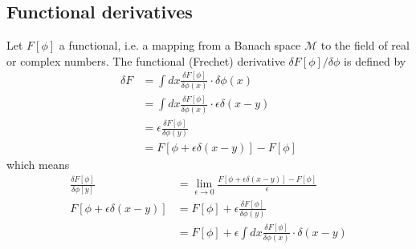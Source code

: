 \documentclass[10pt,a4paper]{book}
\theoremstyle{definition}
\begin{document}
\subsection{Functional derivatives}
Let $F[\phi]$ a functional, i.e. a mapping from a Banach space $\mathcal{M}$ to the field of real or complex numbers. The functional (Frechet) derivative $\delta F[\phi]/\delta\phi$ is defined by
\begin{align}
    \delta F
    &=\int dx \frac{\delta F[\phi]}{\delta\phi(x)}\cdot\delta\phi(x)\\
    &=\int dx \frac{\delta F[\phi]}{\delta\phi(x)}\cdot\epsilon\delta(x-y)\\
    &=\epsilon\frac{\delta F[\phi]}{\delta\phi(y)}\\
    &=F[\phi+\epsilon\delta(x-y)]-F[\phi]
\end{align}
which means
\begin{align}
    \frac{\delta F[\phi]}{\delta\phi[y]}&=\lim_{\epsilon\rightarrow0}\frac{F[\phi+\epsilon\delta(x-y)]-F[\phi]}{\epsilon}\\
    F[\phi+\epsilon\delta(x-y)]&=F[\phi]+\epsilon\frac{\delta F[\phi]}{\delta\phi(y)}\\
    &=F[\phi]+\epsilon\int dx \frac{\delta F[\phi]}{\delta\phi(x)}\cdot\delta(x-y)
\end{align}
\end{document}
